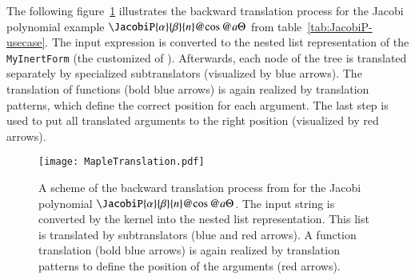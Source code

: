 The following figure~\ref{fig:backward-trans} illustrates the backward translation process for the Jacobi polynomial example $\JacobiP{\alpha}{\beta}{n}@{\cos@{a\Theta}}$ from table~\ref{tab:JacobiP-usecase}. The input expression is converted to the nested list representation of the \texttt{MyInertForm} (the customized \inertF{} of \Maple). Afterwards, each node of the tree is translated separately by specialized subtranslators (visualized by blue arrows). The translation of functions (bold blue arrows) is again realized by translation patterns, which define the correct position for each argument. The last step is used to put all translated arguments to the right position (visualized by red arrows).

\begin{figure}[!htp]
	\centering
	\texttt{[image: MapleTranslation.pdf]}
	\caption{A scheme of the backward translation process from \Maple{} for the Jacobi polynomial $\JacobiP{\alpha}{\beta}{n}@{\cos@{a\Theta}}$. The input string is converted by the \Maple{} kernel into the nested list representation. This list is translated by subtranslators (blue and red arrows). A function translation (bold blue arrows) is again realized by translation patterns to define the position of the arguments (red arrows).}
	\label{fig:backward-trans}
\end{figure}

\cleardoublepage